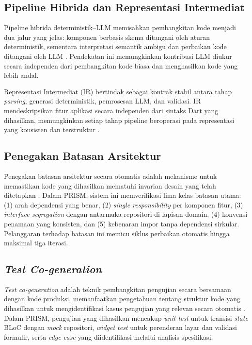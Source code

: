 \subsection{Pipeline Hibrida dan Representasi Intermediat}

Pipeline hibrida deterministik--LLM memisahkan pembangkitan kode menjadi dua jalur yang jelas: komponen berbasis skema ditangani oleh aturan deterministik, sementara interpretasi semantik ambigu dan perbaikan kode ditangani oleh LLM \cite{ghorbani2024}. Pendekatan ini memungkinkan kontribusi LLM diukur secara independen dari pembangkitan kode biasa dan menghasilkan kode yang lebih andal.

Representasi Intermediat (IR) bertindak sebagai kontrak stabil antara tahap \textit{parsing}, generasi deterministik, pemrosesan LLM, dan validasi. IR mendeskripsikan fitur aplikasi secara independen dari sintaks Dart yang dihasilkan, memungkinkan setiap tahap pipeline beroperasi pada representasi yang konsisten dan terstruktur \cite{lamothe2022}.

\subsection{Penegakan Batasan Arsitektur}

Penegakan batasan arsitektur secara otomatis adalah mekanisme untuk memastikan kode yang dihasilkan mematuhi invarian desain yang telah ditetapkan \cite{ghorbani2024}. Dalam PRISM, sistem ini memverifikasi lima kelas batasan utama: (1) arah dependensi yang benar, (2) \textit{single responsibility} per komponen fitur, (3) \textit{interface segregation} dengan antarmuka repositori di lapisan domain, (4) konvensi penamaan yang konsisten, dan (5) kebenaran impor tanpa dependensi sirkular. Pelanggaran terhadap batasan ini memicu siklus perbaikan otomatis hingga maksimal tiga iterasi.

\subsection{\textit{Test Co-generation}}

\textit{Test co-generation} adalah teknik pembangkitan pengujian secara bersamaan dengan kode produksi, memanfaatkan pengetahuan tentang struktur kode yang dihasilkan untuk mengidentifikasi kasus pengujian yang relevan secara otomatis \cite{yang2025}. Dalam PRISM, pengujian yang dihasilkan mencakup \textit{unit test} untuk transisi \textit{state} BLoC dengan \textit{mock} repositori, \textit{widget test} untuk perenderan layar dan validasi formulir, serta \textit{edge case} yang diidentifikasi melalui analisis spesifikasi.

